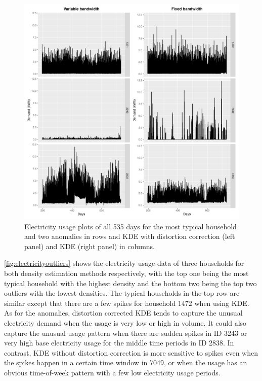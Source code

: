 \documentclass[11pt,a4paper,]{article}
\begin{document}
\begin{figure}

{\centering \includegraphics[width=0.9\linewidth]{figures/kde_2densities_raw_electricity} 

}

\caption{Electricity usage plots of all 535 days for the most typical household and two anomalies in rows and KDE with distortion correction (left panel) and KDE (right panel) in columns.}\label{fig:electricityoutliers}
\end{figure}

\autoref{fig:electricityoutliers} shows the electricity usage data of three households for both density estimation methods respectively, with the top one being the most typical household with the highest density and the bottom two being the top two outliers with the lowest densities.
The typical households in the top row are similar except that there are a few spikes for household \(1472\) when using KDE. As for the anomalies, distortion corrected KDE tends to capture the unusual electricity demand when the usage is very low or high in volume. It could also capture the unusual usage pattern when there are sudden spikes in ID 3243 or very high base electricity usage for the middle time periods in ID 2838. In contrast, KDE without distortion correction is more sensitive to spikes even when the spikes happen in a certain time window in 7049, or when the usage has an obvious time-of-week pattern with a few low electricity usage periods.
\end{document}
